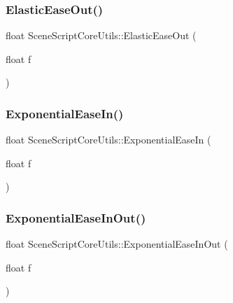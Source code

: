\hypertarget{class_scene_script_core_utils_a44a75d0d088c59dd99e264323ec78c0c}{}\label{class_scene_script_core_utils_a44a75d0d088c59dd99e264323ec78c0c} 
\subsubsection{\texorpdfstring{Elastic\+Ease\+Out()}{ElasticEaseOut()}}
{\footnotesize\ttfamily float Scene\+Script\+Core\+Utils\+::\+Elastic\+Ease\+Out (\begin{DoxyParamCaption}\item[{float}]{f }\end{DoxyParamCaption})}

\hypertarget{class_scene_script_core_utils_afd95bf24890bb207017dd2d9f4aa8007}{}\label{class_scene_script_core_utils_afd95bf24890bb207017dd2d9f4aa8007} 
\subsubsection{\texorpdfstring{Exponential\+Ease\+In()}{ExponentialEaseIn()}}
{\footnotesize\ttfamily float Scene\+Script\+Core\+Utils\+::\+Exponential\+Ease\+In (\begin{DoxyParamCaption}\item[{float}]{f }\end{DoxyParamCaption})}

\hypertarget{class_scene_script_core_utils_a0533b25ed087f309e37c50c7eede9d8f}{}\label{class_scene_script_core_utils_a0533b25ed087f309e37c50c7eede9d8f} 
\subsubsection{\texorpdfstring{Exponential\+Ease\+In\+Out()}{ExponentialEaseInOut()}}
{\footnotesize\ttfamily float Scene\+Script\+Core\+Utils\+::\+Exponential\+Ease\+In\+Out (\begin{DoxyParamCaption}\item[{float}]{f }\end{DoxyParamCaption})}

